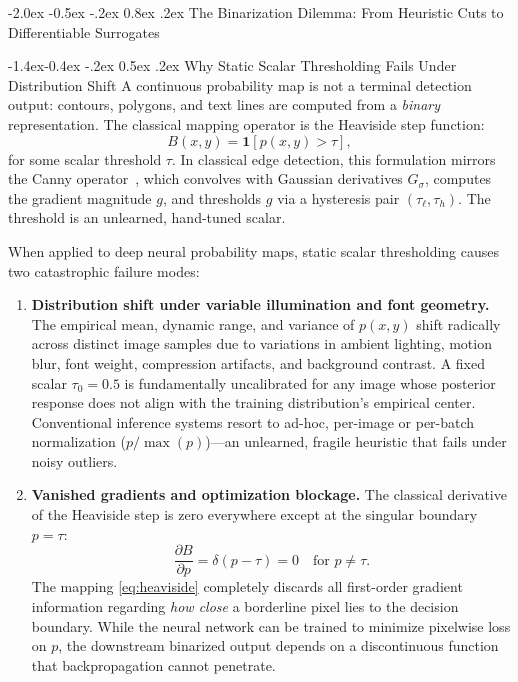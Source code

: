 \documentclass[11pt,a4paper]{article}
\makeatletter
\renewcommand\section{\@startsection {section}{1}{\z@}%
                                   {-2.0ex \@plus -0.5ex \@minus -.2ex}%
                                   {0.8ex \@plus.2ex}%
                                   {\normalfont\large\bfseries}}
\renewcommand\subsection{\@startsection{subsection}{2}{\z@}%
                                     {-1.4ex\@plus -0.4ex \@minus -.2ex}%
                                     {0.5ex \@plus .2ex}%
                                     {\normalfont\normalsize\bfseries}}
\newcommand{\1}{\mathbf{1}}
\makeatother
\begin{document}
\section{The Binarization Dilemma: From Heuristic Cuts to Differentiable Surrogates}

\subsection{Why Static Scalar Thresholding Fails Under Distribution Shift}
A continuous probability map is not a terminal detection output: contours, polygons, and text lines are computed from a \emph{binary} representation. The classical mapping operator is the Heaviside step function:
\begin{equation}
B(x,y) = \1\!\left[ p(x,y) > \tau \right],
\label{eq:heaviside}
\end{equation}
for some scalar threshold $\tau$. In classical edge detection, this formulation mirrors the Canny operator~\cite{canny}, which convolves with Gaussian derivatives $G_\sigma$, computes the gradient magnitude $g$, and thresholds $g$ via a hysteresis pair $(\tau_\ell, \tau_h)$. The threshold is an unlearned, hand-tuned scalar.

When applied to deep neural probability maps, static scalar thresholding causes two catastrophic failure modes:
\begin{enumerate}
    \item \textbf{Distribution shift under variable illumination and font geometry.} The empirical mean, dynamic range, and variance of $p(x,y)$ shift radically across distinct image samples due to variations in ambient lighting, motion blur, font weight, compression artifacts, and background contrast. A fixed scalar $\tau_0 = 0.5$ is fundamentally uncalibrated for any image whose posterior response does not align with the training distribution's empirical center. Conventional inference systems resort to ad-hoc, per-image or per-batch normalization ($p / \max(p)$)---an unlearned, fragile heuristic that fails under noisy outliers.
    \item \textbf{Vanished gradients and optimization blockage.} The classical derivative of the Heaviside step is zero everywhere except at the singular boundary $p = \tau$:
    \[
    \frac{\partial B}{\partial p} = \delta(p - \tau) = 0 \quad \text{for } p \ne \tau.
    \]
    The mapping \eqref{eq:heaviside} completely discards all first-order gradient information regarding \emph{how close} a borderline pixel lies to the decision boundary. While the neural network can be trained to minimize pixelwise loss on $p$, the downstream binarized output depends on a discontinuous function that backpropagation cannot penetrate.
\end{enumerate}
\end{document}
